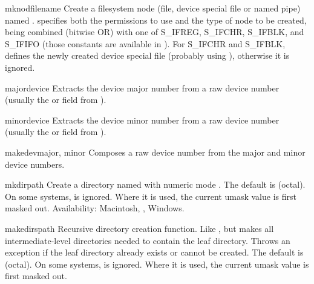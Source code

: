 \begin{funcdesc}{mknod}{filename}
Create a filesystem node (file, device special file or named pipe)
named .  specifies both the permissions to use and
the type of node to be created, being combined (bitwise OR) with one
of S_IFREG, S_IFCHR, S_IFBLK, and S_IFIFO (those constants are
available in ). For S_IFCHR and S_IFBLK, 
defines the newly created device special file (probably using
), otherwise it is ignored.
\end{funcdesc}

\begin{funcdesc}{major}{device}
Extracts the device major number from a raw device number (usually
the  or  field from ).
\end{funcdesc}

\begin{funcdesc}{minor}{device}
Extracts the device minor number from a raw device number (usually
the  or  field from ).
\end{funcdesc}

\begin{funcdesc}{makedev}{major, minor}
Composes a raw device number from the major and minor device numbers.
\end{funcdesc}

\begin{funcdesc}{mkdir}{path}
Create a directory named  with numeric mode .
The default  is  (octal).  On some systems,
 is ignored.  Where it is used, the current umask value is
first masked out.
Availability: Macintosh, \UNIX, Windows.
\end{funcdesc}

\begin{funcdesc}{makedirs}{path}
Recursive directory creation function.
Like ,
but makes all intermediate-level directories needed to contain the
leaf directory.  Throws an  exception if the leaf
directory already exists or cannot be created.  The default 
is  (octal).  On some systems,  is ignored.
Where it is used, the current umask value is first masked out.
\end{funcdesc}

